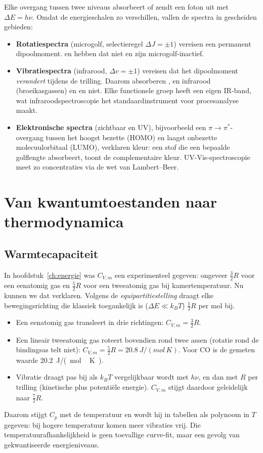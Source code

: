 Elke overgang tussen twee niveaus absorbeert of zendt een foton uit met $\Delta E = h\nu$. Omdat de energieschalen zo verschillen, vallen de spectra in gescheiden gebieden:
\begin{itemize}
\item \textbf{Rotatiespectra} (microgolf, selectieregel $\Delta J=\pm1$) vereisen een permanent dipoolmoment.  en  hebben dat niet en zijn microgolf-inactief.
\item \textbf{Vibratiespectra} (infrarood, $\Delta v=\pm1$) vereisen dat het dipoolmoment \emph{verandert} tijdens de trilling. Daarom absorberen ,  en  infrarood (broeikasgassen) en  en  niet. Elke functionele groep heeft een eigen IR-band, wat infraroodspectroscopie het standaardinstrument voor procesanalyse maakt.
\item \textbf{Elektronische spectra} (zichtbaar en UV), bijvoorbeeld een $\pi\to\pi^*$-overgang tussen het hoogst bezette (HOMO) en laagst onbezette molecuulorbitaal (LUMO), verklaren kleur: een stof die een bepaalde golflengte absorbeert, toont de complementaire kleur. UV-Vis-spectroscopie meet zo concentraties via de wet van Lambert--Beer.
\end{itemize}

\section{Van kwantumtoestanden naar thermodynamica}

\subsection{Warmtecapaciteit}

In hoofdstuk~\ref{ch:energie} was $C_{V,m}$ een experimenteel gegeven: ongeveer $\tfrac{3}{2}R$ voor een eenatomig gas en $\tfrac{5}{2}R$ voor een tweeatomig gas bij kamertemperatuur. Nu kunnen we dat verklaren. Volgens de \emph{equipartitiestelling} draagt elke bewegingsrichting die klassiek toegankelijk is ($\Delta E \ll k_BT$) $\tfrac{1}{2}R$ per mol bij.
\begin{itemize}
\item Een eenatomig gas transleert in drie richtingen: $C_{V,m}=\tfrac{3}{2}R$.
\item Een lineair tweeatomig gas roteert bovendien rond twee assen (rotatie rond de bindingsas telt niet): $C_{V,m}=\tfrac{5}{2}R = \SI{20.8}{J/(mol\,K)}$. Voor CO is de gemeten waarde \SI{20.2}{J/(mol\,K)}.
\item Vibratie draagt pas bij als $k_BT$ vergelijkbaar wordt met $h\nu$, en dan met $R$ per trilling (kinetische plus potentiële energie). $C_{V,m}$ stijgt daardoor geleidelijk naar $\tfrac{7}{2}R$.
\end{itemize}
Daarom stijgt $C_p$ met de temperatuur en wordt hij in tabellen als polynoom in $T$ gegeven: bij hogere temperatuur komen meer vibraties vrij. Die temperatuurafhankelijkheid is geen toevallige curve-fit, maar een gevolg van gekwantiseerde energieniveaus.

